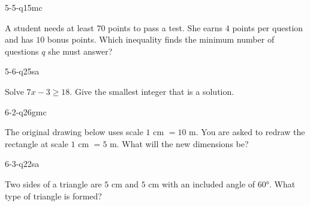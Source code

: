 \begin{practiceQuestion}{5-5-q15}{mc}
\begin{questionText}
A student needs at least $70$ points to pass a test. She earns $4$ points per question and has $10$ bonus points. Which inequality finds the minimum number of questions $q$ she must answer?
\end{questionText}
\end{practiceQuestion}

\begin{practiceQuestion}{5-6-q25}{sa}
\begin{questionText}
Solve $7x - 3 \geq 18$. Give the smallest integer that is a solution.
\end{questionText}
\end{practiceQuestion}

\begin{practiceQuestion}{6-2-q26}{gmc}
\begin{questionText}
The original drawing below uses scale $1$ cm $= 10$ m. You are asked to redraw the rectangle at scale $1$ cm $= 5$ m. What will the new dimensions be?

\begin{center}
\end{center}
\end{questionText}
\end{practiceQuestion}

\begin{practiceQuestion}{6-3-q22}{sa}
\begin{questionText}
Two sides of a triangle are $5$ cm and $5$ cm with an included angle of $60°$. What type of triangle is formed?
\end{questionText}
\end{practiceQuestion}

